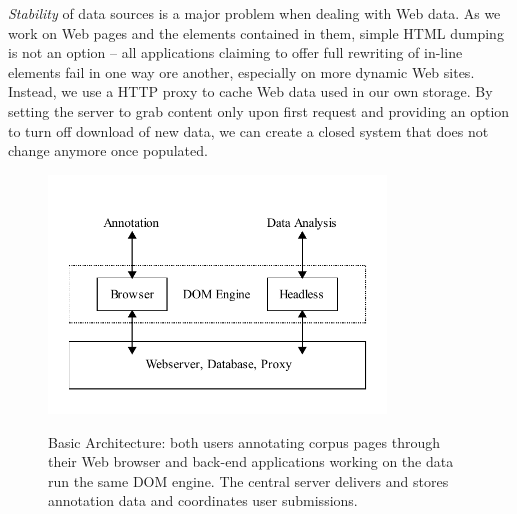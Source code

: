 \textit{Stability} of data sources is a major problem when dealing with Web data.
As we work on Web pages and the elements contained in them, simple HTML dumping is not an option -- all applications claiming to offer full rewriting of in-line elements fail in one way ore another, especially on more dynamic Web sites.
Instead, we use a HTTP proxy to cache Web data used in our own storage.
By setting the server to grab content only upon first request and providing an option to turn off download of new data, we can create a closed system that does not change anymore once populated.

\begin{figure}
	{\includegraphics[width=0.8\textwidth]{arch}}
\caption{\label{f:arch}Basic {\KrdWrd} Architecture: both users annotating corpus pages through their Web browser
and back-end applications working on the data run the same DOM engine.
	The central server delivers and stores annotation data and coordinates user submissions.}
\end{figure}
